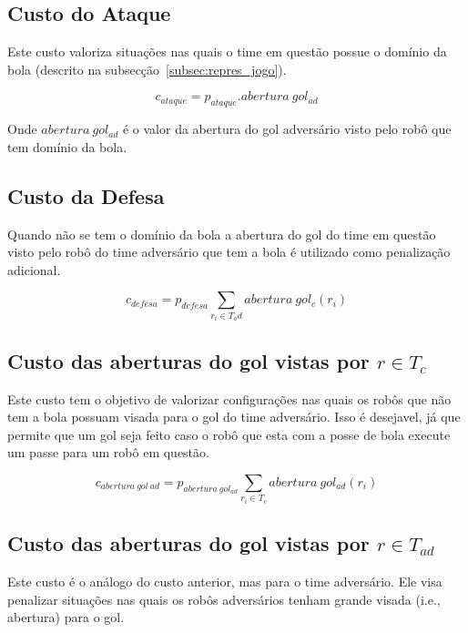 \subsection{Custo do Ataque}
Este custo valoriza situações nas quais o time em questão
possue o domínio da bola (descrito na subsecção~\ref{subsec:repres_jogo}).

\begin{dmath} 
 c_{ataque} = p_{ataque} . abertura{\ }gol_{ad}
\end{dmath} 

Onde $abertura{\ }gol_{ad}$ é o valor da abertura do gol adversário visto
pelo robô que tem domínio da bola.

\subsection{Custo da Defesa}
Quando não se tem o domínio da bola a abertura do gol do time em questão
visto pelo robô do time adversário que tem a bola é utilizado
como penalização adicional.

\begin{dmath}
  c_{defesa} = p_{defesa}
   \sum_{r_i \in T_ad} abertura{\ }gol_c(r_i)
\end{dmath}

\subsection{Custo das aberturas do gol vistas por $r\in T_c$}

Este custo tem o objetivo de valorizar configurações nas quais
os robôs que não tem a bola possuam visada para o gol do time
adversário. Isso
é desejavel, já que permite que um gol seja feito caso o robô
que esta com a posse de bola execute um passe para um robô
em questão.

\begin{dmath}
   c_{abertura{\ }gol{\ }ad} = p_{abertura{\ }gol_{ad}}
    \sum_{r_i \in T_c} abertura{\ }gol_{ad}(r_i)
\end{dmath}

\subsection{Custo das aberturas do gol vistas por $r\in T_{ad}$}

Este custo é o análogo do custo anterior, mas para o
time adversário. Ele visa penalizar situações nas quais
os robôs adversários tenham grande visada (i.e., abertura)
para o gol. 

